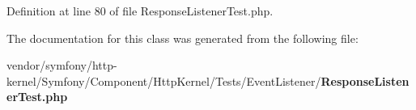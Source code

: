 Definition at line 80 of file Response\+Listener\+Test.\+php.



The documentation for this class was generated from the following file\+:\begin{DoxyCompactItemize}
\item 
vendor/symfony/http-\/kernel/\+Symfony/\+Component/\+Http\+Kernel/\+Tests/\+Event\+Listener/{\bf Response\+Listener\+Test.\+php}\end{DoxyCompactItemize}

